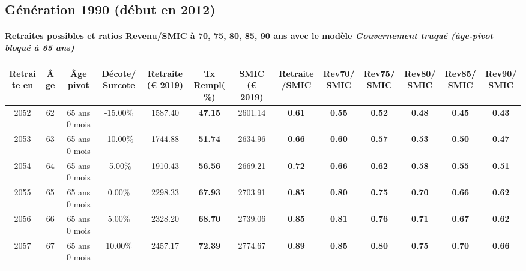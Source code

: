 \newpage 
 
\subsection{Génération 1990 (début en 2012)} 

\paragraph{Retraites possibles et ratios Revenu/SMIC à 70, 75, 80, 85, 90 ans avec le modèle \emph{Gouvernement truqué (âge-pivot bloqué à 65 ans)}}  
 
{ \scriptsize \begin{center} 
\begin{tabular}[htb]{|c|c||c|c||c|c||c||c|c|c|c|c|c|} 
\hline 
 Retraite en &  Âge &  Âge pivot &  Décote/Surcote &  Retraite (\euro{} 2019) &  Tx Rempl(\%) &  SMIC (\euro{} 2019) &  Retraite/SMIC &  Rev70/SMIC &  Rev75/SMIC &  Rev80/SMIC &  Rev85/SMIC &  Rev90/SMIC \\ 
\hline \hline 
 2052 &  62 &  65 ans 0 mois &  -15.00\% &  1587.40 &  {\bf 47.15} &  2601.14 &  {\bf {\color{red} 0.61}} &  {\bf {\color{red} 0.55}} &  {\bf {\color{red} 0.52}} &  {\bf {\color{red} 0.48}} &  {\bf {\color{red} 0.45}} &  {\bf {\color{red} 0.43}} \\ 
\hline 
 2053 &  63 &  65 ans 0 mois &  -10.00\% &  1744.88 &  {\bf 51.74} &  2634.96 &  {\bf {\color{red} 0.66}} &  {\bf {\color{red} 0.60}} &  {\bf {\color{red} 0.57}} &  {\bf {\color{red} 0.53}} &  {\bf {\color{red} 0.50}} &  {\bf {\color{red} 0.47}} \\ 
\hline 
 2054 &  64 &  65 ans 0 mois &  -5.00\% &  1910.43 &  {\bf 56.56} &  2669.21 &  {\bf {\color{red} 0.72}} &  {\bf {\color{red} 0.66}} &  {\bf {\color{red} 0.62}} &  {\bf {\color{red} 0.58}} &  {\bf {\color{red} 0.55}} &  {\bf {\color{red} 0.51}} \\ 
\hline 
 2055 &  65 &  65 ans 0 mois &  0.00\% &  2298.33 &  {\bf 67.93} &  2703.91 &  {\bf {\color{red} 0.85}} &  {\bf {\color{red} 0.80}} &  {\bf {\color{red} 0.75}} &  {\bf {\color{red} 0.70}} &  {\bf {\color{red} 0.66}} &  {\bf {\color{red} 0.62}} \\ 
\hline 
 2056 &  66 &  65 ans 0 mois &  5.00\% &  2328.20 &  {\bf 68.70} &  2739.06 &  {\bf {\color{red} 0.85}} &  {\bf {\color{red} 0.81}} &  {\bf {\color{red} 0.76}} &  {\bf {\color{red} 0.71}} &  {\bf {\color{red} 0.67}} &  {\bf {\color{red} 0.62}} \\ 
\hline 
 2057 &  67 &  65 ans 0 mois &  10.00\% &  2457.17 &  {\bf 72.39} &  2774.67 &  {\bf {\color{red} 0.89}} &  {\bf {\color{red} 0.85}} &  {\bf {\color{red} 0.80}} &  {\bf {\color{red} 0.75}} &  {\bf {\color{red} 0.70}} &  {\bf {\color{red} 0.66}} \\ 
\hline 
\hline 
\end{tabular} 
\end{center} } 
